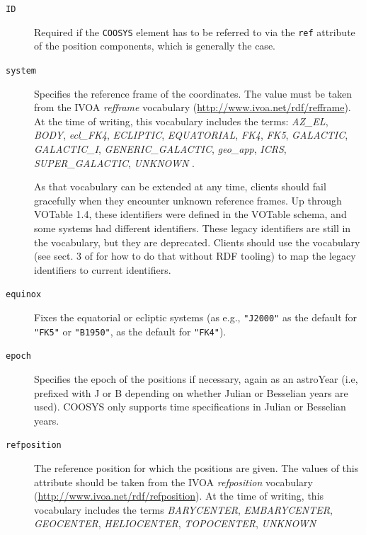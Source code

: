 \documentclass[11pt,a4paper]{ivoa}
\let\fg=\color
\def\attr#1{{\tt{\fg{DarkRed}#1}}}
\def\elem#1{{\tt{\fg{DarkRed}#1}}}
\begin{document}
\begin{description}
\item[\attr{ID}] Required if the \elem{COOSYS} element has to
be referred to via the \attr{ref} attribute of the position components,
which is generally the case.

\item[\attr{system}] Specifies the reference frame of the coordinates.
The value must be taken from the IVOA \emph{refframe} vocabulary
(\url{http://www.ivoa.net/rdf/refframe}).  At the time of writing, this
vocabulary includes the terms:
\textsl{AZ\_EL},
\textsl{BODY},
\textsl{ecl\_FK4},
\textsl{ECLIPTIC},
\textsl{EQUATORIAL},
\textsl{FK4},
\textsl{FK5},
\textsl{GALACTIC},
\textsl{GALACTIC\_I},
\textsl{GENERIC\_GALACTIC},
\textsl{geo\_app},
\textsl{ICRS},
\textsl{SUPER\_GALACTIC},
\textsl{UNKNOWN}
.

As that vocabulary can be extended at any time, clients should fail
gracefully when they encounter unknown reference frames.  Up through
VOTable 1.4, these identifiers were defined in the VOTable schema, and some
systems had different identifiers.  These legacy identifiers are still
in the vocabulary, but they are deprecated.  Clients should use the
vocabulary (see sect. 3 of \citet{2023ivoa.spec.0206D} for how to do
that without RDF tooling) to map the legacy identifiers to current
identifiers.

\item[\attr{equinox}] Fixes the
equatorial or ecliptic systems (as e.g., \verb|"J2000"| as the default
for \verb|"FK5"| or \verb|"B1950"|, as the default for
\verb|"FK4"|).

\item[\attr{epoch}] Specifies the epoch of the positions
if necessary, again as an astroYear (i.e, prefixed with J or B depending
on whether Julian or Besselian years are used).  COOSYS only supports time
specifications in Julian or Besselian years.

\item[\attr{refposition}] The reference position for which the positions
are given.  The values of this attribute should be taken from the IVOA
\emph{refposition} vocabulary (\url{http://www.ivoa.net/rdf/refposition}).
At the time of writing, this vocabulary includes the terms
\textsl{BARYCENTER},
\textsl{EMBARYCENTER},
\textsl{GEOCENTER},
\textsl{HELIOCENTER},
\textsl{TOPOCENTER},
\textsl{UNKNOWN}
\end{description}
\end{document}
